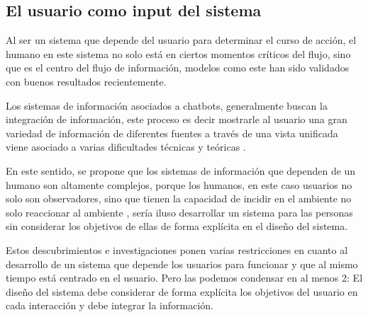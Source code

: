     \subsection{El usuario como input del sistema}
    \par Al ser un sistema que depende del usuario para determinar el curso de acción, el humano en este sistema no solo está en ciertos momentos críticos del flujo, sino que es el centro del flujo de información, modelos como este han sido validados con buenos resultados \cite{Smith2018} recientemente.
    \par Los sistemas de información asociados a chatbots, generalmente buscan la integración de información, este proceso es decir mostrarle al usuario una gran variedad de información de diferentes fuentes a través de una vista unificada viene asociado a varias dificultades técnicas y teóricas \cite{Li2017}.
    \par En este sentido, se propone que los sistemas de información que dependen de un humano son altamente complejos, porque los humanos, en este caso usuarios no solo son observadores, sino que tienen la capacidad de incidir en el ambiente no solo reaccionar al ambiente \cite{McBride2021}, sería iluso desarrollar un sistema para las personas sin considerar los objetivos de ellas de forma explícita en el diseño del sistema.
    \par Estos descubrimientos e investigaciones ponen varias restricciones en cuanto al desarrollo de un sistema que depende los usuarios para funcionar y que al mismo tiempo está centrado en el usuario. Pero las podemos condensar en al menos 2: El diseño del sistema debe considerar de forma explícita los objetivos del usuario en cada interacción y debe integrar la información.

